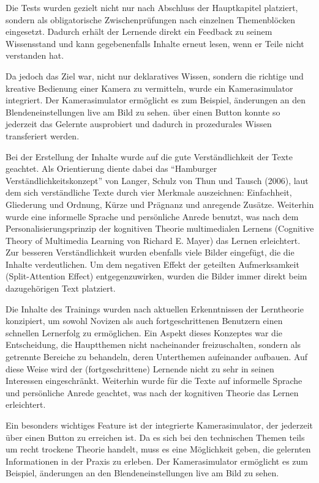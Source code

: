 \documentclass{article}
\begin{document}
Die Tests wurden gezielt nicht nur nach Abschluss der Hauptkapitel platziert, sondern als obligatorische Zwischenpr\"ufungen nach einzelnen Themenbl\"ocken eingesetzt. Dadurch erh\"alt der Lernende direkt ein Feedback zu seinem Wissensstand und kann gegebenenfalls Inhalte erneut lesen, wenn er Teile nicht verstanden hat.

Da jedoch das Ziel war, nicht nur deklaratives Wissen, sondern die richtige und kreative Bedienung einer Kamera zu vermitteln, wurde ein Kamerasimulator integriert. Der Kamerasimulator erm\"oglicht es zum Beispiel, \"anderungen an den Blendeneinstellungen live am Bild zu sehen. \"uber einen Button konnte so jederzeit das Gelernte ausprobiert und dadurch in prozedurales Wissen transferiert werden. 

Bei der Erstellung der Inhalte wurde auf die gute Verst\"andlichkeit der Texte geachtet. Als Orientierung diente dabei das ``Hamburger Verst\"andlichkeitskonzept'' von Langer, Schulz von Thun und Tausch (2006)\cite{rey2009e-learning}, laut dem sich verst\"andliche Texte durch vier Merkmale auszeichnen: Einfachheit, Gliederung und Ordnung, K\"urze und Pr\"agnanz und anregende Zus\"atze. Weiterhin wurde eine informelle Sprache und pers\"onliche Anrede benutzt, was nach dem Personalisierungsprinzip der kognitiven Theorie multimedialen Lernens (Cognitive Theory of Multimedia Learning von Richard E. Mayer) das Lernen erleichtert. 
Zur besseren Verst\"andlichkeit wurden ebenfalls viele Bilder eingef\"ugt, die die Inhalte verdeutlichen. Um dem negativen Effekt der geteilten Aufmerksamkeit (Split-Attention Effect) entgegenzuwirken, wurden die Bilder immer direkt beim dazugeh\"origen Text platziert. 


Die Inhalte des Trainings wurden nach aktuellen Erkenntnissen der Lerntheorie konzipiert, um sowohl Novizen als auch fortgeschrittenen Benutzern einen schnellen Lernerfolg zu erm\"oglichen.
Ein Aspekt dieses Konzeptes war die Entscheidung, die Hauptthemen nicht nacheinander freizuschalten, sondern als getrennte Bereiche zu behandeln, deren Unterthemen aufeinander aufbauen. Auf diese Weise wird der (fortgeschrittene) Lernende nicht zu sehr in seinen Interessen eingeschr\"ankt.
Weiterhin wurde f\"ur die Texte auf informelle Sprache und pers\"onliche Anrede geachtet, was nach der kognitiven Theorie das Lernen erleichtert.

Ein besonders wichtiges Feature ist der integrierte Kamerasimulator, der jederzeit \"uber einen Button zu erreichen ist. Da es sich bei den technischen Themen teils um recht trockene Theorie handelt, muss es eine M\"oglichkeit geben, die gelernten Informationen in der Praxis zu erleben. Der Kamerasimulator erm\"oglicht es zum Beispiel, \"anderungen an den Blendeneinstellungen live am Bild zu sehen.
\end{document}
